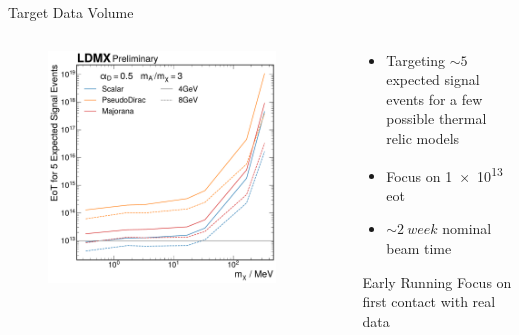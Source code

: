 \documentclass[aspectratio=169]{beamer}
\begin{document}

\begin{frame}{Target Data Volume}
  \begin{columns}
    \begin{column}{0.45\textwidth}
      \begin{figure}
        \centering
        \includegraphics[width=0.9\textwidth]{figs/eot-for-n-signal.pdf}
      \end{figure}
    \end{column}
    \begin{column}{0.55\textwidth}
      \begin{itemize}
        \item Targeting $\sim 5$ expected signal events for a few possible thermal relic models
        \item Focus on \num{1e13} \ac{eot}
        \item $\sim\qty{2}{week}$ nominal beam time
      \end{itemize}

      \begin{block}{Early Running}
        Focus on first contact with real data
      \end{block}
    \end{column}
  \end{columns}
\end{frame}
\end{document}
